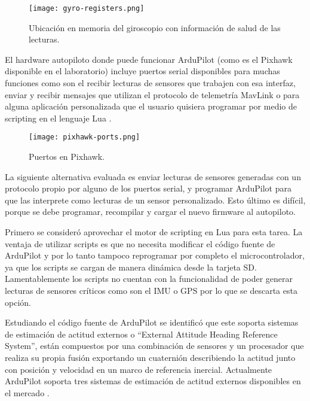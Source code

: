 \begin{figure}[h]
    \centering
    \texttt{[image: gyro-registers.png]}
    \caption{Ubicación en memoria del giroscopio con información de salud de las lecturas.}
    \label{fig:gyro-health}
\end{figure}

El hardware autopiloto donde puede funcionar ArduPilot (como es el Pixhawk disponible en el laboratorio) incluye puertos serial disponibles para muchas funciones como son el recibir lecturas de sensores que trabajen con esa interfaz, enviar y recibir mensajes que utilizan el protocolo de telemetría MavLink \cite{ap-serial} o para alguna aplicación personalizada que el usuario quisiera programar por medio de scripting en el lenguaje Lua \cite{ap-scripting}.

\begin{figure}[h]
    \centering
    \texttt{[image: pixhawk-ports.png]}
    \caption[Puertos en Pixhawk.]{Puertos en Pixhawk.\footnotemark}
    \label{fig:pixhawk-ports}
\end{figure}

La siguiente alternativa evaluada es enviar lecturas de sensores generadas con un protocolo propio por alguno de los puertos serial, y programar ArduPilot para que las interprete como lecturas de un sensor personalizado. Esto último es difícil, porque se debe programar, recompilar y cargar el nuevo firmware al autopiloto.

Primero se consideró aprovechar el motor de scripting en Lua para esta tarea. La ventaja de utilizar scripts es que no necesita modificar el código fuente de ArduPilot y por lo tanto tampoco reprogramar por completo el microcontrolador, ya que los scripts se cargan de manera dinámica desde la tarjeta SD. Lamentablemente los scripts no cuentan con la funcionalidad de poder generar lecturas de sensores críticos como son el IMU o GPS por lo que se descarta esta opción.

Estudiando el código fuente de ArduPilot se identificó que este soporta sistemas de estimación de actitud externos o ``External Attitude Heading Reference System'', están compuestos por una combinación de sensores y un procesador que realiza su propia fusión exportando un cuaternión describiendo la actitud junto con posición y velocidad en un marco de referencia inercial. Actualmente ArduPilot soporta tres sistemas de estimación de actitud externos disponibles en el mercado \cite{ap-eahrs}.

